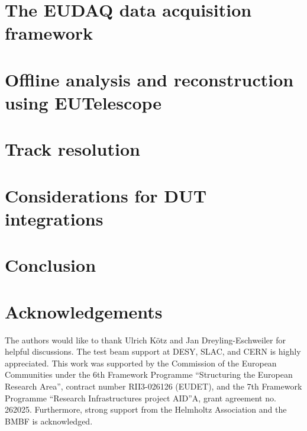 \documentclass[a4paper,10pt]{scrartcl}
\begin{document}
\section{The EUDAQ data acquisition framework}
\label{sec:eudaq}


\section{Offline analysis and reconstruction using EUTelescope}
\label{sec:offline}


\section{Track resolution}
\label{sec:trackres}


\section{Considerations for DUT integrations}
\label{sec:dutintegration}


\section{Conclusion}
\label{sec:conclusion}



\section*{Acknowledgements}
The authors would like to thank Ulrich K\"otz and Jan Dreyling-Eschweiler for helpful discussions. 
The test beam support at DESY, SLAC, and CERN is highly appreciated. 
This work was supported by the Commission of the European Communities under the 6th Framework Programme “Structuring the European Research Area”, contract number RII3-026126 (EUDET),
 and the 7th Framework Programme ``Research Infrastructures project AID''A, grant agreement no.\,262025. 
Furthermore, strong support from the Helmholtz Association and the BMBF is acknowledged.

\small


\end{document}
